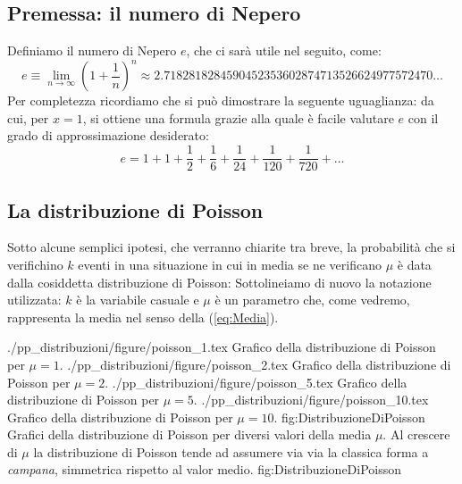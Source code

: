 \subsection{Premessa: il numero di Nepero}

Definiamo il numero di Nepero $e$, che ci sar\`a utile nel seguito, come:
$$
e \equiv \lim_{n\to\infty} \left( 1 + \frac{1}{n} \right)^n
\approx 2.7182818284590452353602874713526624977572470 \ldots
$$
Per completezza ricordiamo che si pu\`o dimostrare la seguente uguaglianza:
da cui, per $x = 1$, si ottiene una formula grazie alla quale \`e facile
valutare $e$ con il grado di approssimazione desiderato:
$$
e = 1 + 1 + \frac{1}{2} + \frac{1}{6} + \frac{1}{24} + \frac{1}{120}
+ \frac{1}{720} + \ldots
$$

\subsection{La distribuzione di Poisson}

Sotto alcune semplici ipotesi, che verranno chiarite tra breve,
la probabilit\`a che si verifichino $k$ eventi in una situazione
in cui in media se ne verificano $\mu$ \`e data dalla cosiddetta
distribuzione di Poisson:
Sottolineiamo di nuovo la notazione utilizzata:
$k$ \`e la variabile casuale e $\mu$ \`e un parametro che, come vedremo,
rappresenta la media nel senso della (\ref{eq:Media}).

\panelfig
{\twobytwotexfig
{./pp_distribuzioni/figure/poisson_1.tex}
{Grafico della distribuzione di Poisson per $\mu=1$.}
{./pp_distribuzioni/figure/poisson_2.tex}
{Grafico della distribuzione di Poisson per $\mu=2$.}
{./pp_distribuzioni/figure/poisson_5.tex}
{Grafico della distribuzione di Poisson per $\mu=5$.}
{./pp_distribuzioni/figure/poisson_10.tex}
{Grafico della distribuzione di Poisson per $\mu=10$.}
{fig:DistribuzioneDiPoisson}}
{Grafici della distribuzione di Poisson per diversi valori della media $\mu$.
Al crescere di $\mu$ la distribuzione di Poisson tende ad assumere via via
la classica forma a {\itshape campana}, simmetrica rispetto al valor medio.}
{fig:DistribuzioneDiPoisson}

